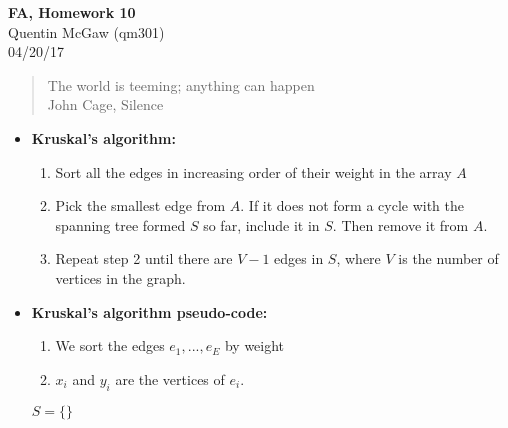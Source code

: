 \documentclass[11pt]{article}
\begin{document}
\begin{center} {\Large\bf FA, Homework 10} \\ Quentin McGaw (qm301) \\ 04/20/17
\end{center}

\begin{quote}
The world is teeming; anything can happen
\\ John Cage, Silence
\end{quote}

\begin{itemize}
    \item \textbf{Kruskal's algorithm:}
    \begin{enumerate}
        \item Sort all the edges in increasing order of their weight in the array $A$
        \item Pick the smallest edge from $A$. If it does not form a cycle with the spanning tree formed $S$ so far, include it in $S$. Then remove it from $A$.
        \item Repeat step 2 until there are $V-1$ edges in $S$, where $V$ is the number of vertices in the graph.
    \end{enumerate}
    \item \textbf{Kruskal's algorithm pseudo-code:}
    \begin{enumerate}
        \item We sort the edges $e_1, ..., e_E$ by weight
        \item $x_i$ and $y_i$ are the vertices of $e_i$.
    \end{enumerate}
    \begin{algorithm}[H]
        $S = \{\}$ \\
    \end{algorithm}
\end{itemize}
\end{document}
